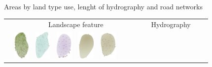 \documentclass[portrait,a0]{sciposter}
\begin{document}
\begin{minipage}[b]{\textwidth}
\begin{multicols}{3}
    \footnotesize
    \begin{center}
      \captionsetup{type=table}
      \caption{Areas by land type use, lenght of hydrography and road networks }\label{tab:stats}
      \setcellgapes{2pt}
      \begin{tabular}{l|cccccccc|c|ccccc|c|r}
        & \multicolumn{8}{c|}{Landscape feature}
        & 
        & \multicolumn{5}{c|}{Hydrography}
        &
        &\\
        &\includegraphics[height=40pt]{gfx/foret_couleur.png}
        &\includegraphics[height=40pt]{gfx/marais_couleur.png}
        &\includegraphics[height=40pt]{gfx/vigne_couleur.png}
        &\includegraphics[height=40pt]{gfx/landes_couleur.png}
        &\includegraphics[height=40pt]{gfx/broussailles_couleur.png}

\end{tabular}
\end{center}
\end{multicols}
\end{minipage}
\end{document}
